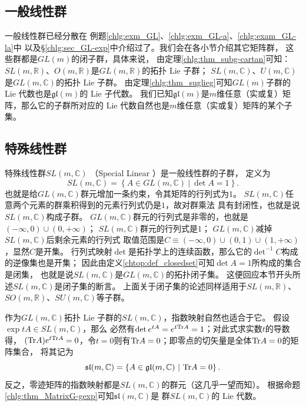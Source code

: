 \subsection{一般线性群} %
一般线性群已经分散在
例题\ref{chlg:exm_GL}、\ref{chlg:exm_GL-a}、\ref{chlg:exam_GL-la}中
以及\S\ref{chlg:sec_GL-exp}中介绍过了。我们会在各小节介绍其它矩阵群，
这些群都是$GL(m)$的闭子群，具体来说，
由定理\ref{chlg:thm_subg-cartan}可知：
$SL(m,\mathbb{R})$、$O(m,\mathbb{R})$是$GL(m,\mathbb{R})$的拓扑 Lie 子群；
$SL(m,\mathbb{C})$、$U(m,\mathbb{C})$是$GL(m,\mathbb{C})$的拓扑 Lie 子群。
由定理\ref{chlg:thm_suglieg}可知$GL(m)$子群的 Lie 代数也是$\mathfrak{gl}(m)$的 Lie 子代数。
我们已知$\mathfrak{gl}(m)$是$m$维任意（实或复）矩阵，那么它的子群所对应的
 Lie 代数自然也是$m$维任意（实或复）矩阵的某个子集。






\subsection{特殊线性群}\label{chlg:sec_SL}
特殊线性群$SL(m,\mathbb{C})$ （Special Linear ）是一般线性群的子群，
定义为
\begin{equation}
    SL(m,\mathbb{C}) = \left\{ A \in GL(m,\mathbb{C})\ |\ \det A =1 \right\} .
\end{equation}
也就是给$GL(m,\mathbb{C})$群元增加一条约束，令其矩阵的行列式为$1$。
$SL(m,\mathbb{C})$任意两个元素的群乘积得到的元素行列式仍是$1$，故对群乘法
具有封闭性，也就是说$SL(m,\mathbb{C})$构成子群。
$GL(m,\mathbb{C})$群元的行列式是非零的，也就是$(-\infty,0)\cup (0,+\infty)$；
$SL(m,\mathbb{C})$群元的行列式是$1$；
$GL(m,\mathbb{C})$减掉$SL(m,\mathbb{C})$后剩余元素的行列式
取值范围是$C\equiv (-\infty,0)\cup (0,1)\cup (1,+\infty)$，显然$C$是开集。
行列式映射$\det$是拓扑学上的连续函数，那么它的$\det^{-1}C$构成的逆像集也是开集；
因此由定义\ref{chtop:def_closedset}可知$\det A =1$所构成的集合是{\kaishu 闭集}，
也就是说$SL(m,\mathbb{C})$是$GL(m,\mathbb{C})$的拓扑闭子集。
这便回应本节开头所述$SL(m,\mathbb{C})$是闭子集的断言。
上面关于闭子集的论述同样适用于$SL(m,\mathbb{R})$、
$SO(m,\mathbb{R})$、$SU(m,\mathbb{C})$等子群。


作为$GL(m,\mathbb{C})$拓扑 Lie 子群的$SL(m,\mathbb{C})$，指数映射自然也适合于它。
假设$\exp tA \in SL(m,\mathbb{C})$，那么
必然有$\det e^{tA} =e^{t {\rm Tr}A} =1$；对此式求实数$t$的导数得，
$({\rm Tr}A) e^{t {\rm Tr}A} =0$，令$t=0$则有${\rm Tr}A=0$；即零点的切矢量是全体${\rm Tr}A=0$的矩阵集合，
将其记为
\begin{equation}
    \mathfrak{sl}(m,\mathbb{C})= \left\{A\in\mathfrak{gl}(m,\mathbb{C})\ |\ {\rm Tr} A =0 \right\} .
\end{equation}
反之，零迹矩阵的指数映射都是$SL(m,\mathbb{C})$的群元（这几乎一望而知）。
根据命题\ref{chlg:thm_MatrixG-gexp}可知$\mathfrak{sl}(m,\mathbb{C})$是
群$SL(m,\mathbb{C})$的 Lie 代数。

